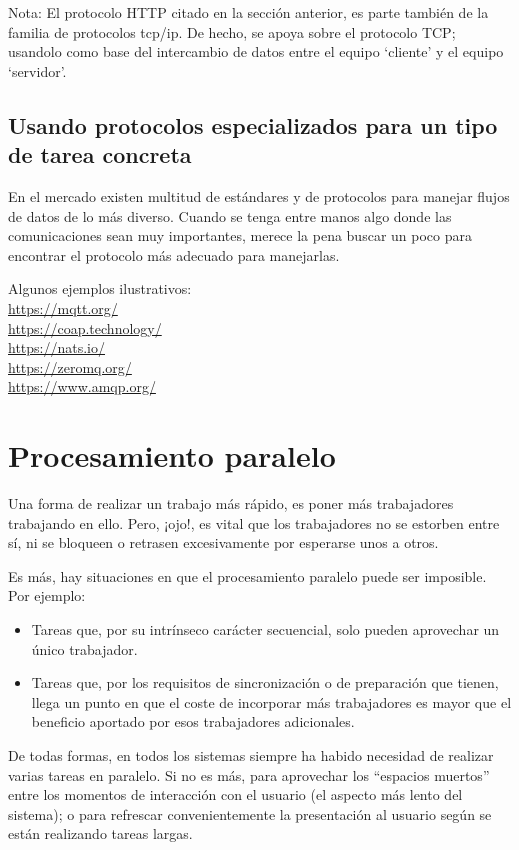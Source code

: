\documentclass[spanish,12pt,a4paper,final,oneside]{book}
\begin{document}
Nota: El protocolo HTTP citado en la sección anterior, es parte también de la familia de protocolos tcp/ip. De hecho, se apoya sobre el protocolo TCP; usandolo como base del intercambio de datos entre el equipo ‘cliente’ y el equipo ‘servidor’.

\section{Usando protocolos especializados para un tipo de tarea concreta}
En el mercado existen multitud de estándares y de protocolos para manejar flujos de datos de lo más diverso. Cuando se tenga entre manos algo donde las comunicaciones sean muy importantes, merece la pena buscar un poco para encontrar el protocolo más adecuado para manejarlas.

Algunos ejemplos ilustrativos:
\\ \url{https://mqtt.org/}
\\ \url{https://coap.technology/}
\\ \url{https://nats.io/}
\\ \url{https://zeromq.org/}
\\ \url{https://www.amqp.org/}



\chapter{Procesamiento paralelo}
Una forma de realizar un trabajo más rápido, es poner más trabajadores trabajando en ello. Pero, ¡ojo!, es vital que los trabajadores no se estorben entre sí, ni se bloqueen o retrasen excesivamente por esperarse unos a otros.

Es más, hay situaciones en que el procesamiento paralelo puede ser imposible. Por ejemplo:
\begin{itemize}
\item Tareas que, por su intrínseco carácter secuencial, solo pueden aprovechar un único trabajador. 
\item Tareas que, por los requisitos de sincronización o de preparación que tienen, llega un punto en que el coste de incorporar más trabajadores es mayor que el beneficio aportado por esos trabajadores adicionales.
\end{itemize}

De todas formas, en todos los sistemas siempre ha habido necesidad de realizar varias tareas en paralelo. Si no es más, para aprovechar los ``espacios muertos'' entre los momentos de interacción con el usuario (el aspecto más lento del sistema); o para refrescar convenientemente la presentación al usuario según se están realizando tareas largas.
\end{document}
